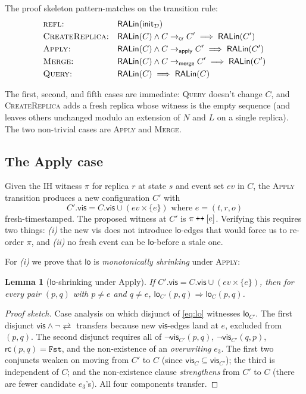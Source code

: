 \documentclass[11pt,a4paper]{article}
\newtheorem{lemma}[theorem]{Lemma}
\theoremstyle{definition}
\theoremstyle{remark}
\newcommand{\RDT}{\ensuremath{\mathcal{D}}}
\newcommand{\mrc}{\mathsf{rc}}
\newcommand{\mvis}{\mathsf{vis}}
\newcommand{\mlo}{\mathsf{lo}}
\newcommand{\Fst}{\mathtt{Fst}}
\newcommand{\ev}{\mathit{ev}}
\newcommand{\commute}{\mathrel{\rightleftarrows}}
\newcommand{\RALin}{\mathsf{RALin}}
\begin{document}
The proof skeleton pattern-matches on the transition rule:
\begin{align*}
  &\textsc{refl:} & & \RALin(\mathsf{init}_\RDT) \\
  &\textsc{CreateReplica:} & & \RALin(C) \wedge C \to_{\mathsf{cr}} C' \;\Longrightarrow\; \RALin(C') \\
  &\textsc{Apply:} & & \RALin(C) \wedge C \to_{\mathsf{apply}} C' \;\Longrightarrow\; \RALin(C') \\
  &\textsc{Merge:} & & \RALin(C) \wedge C \to_{\mathsf{merge}} C' \;\Longrightarrow\; \RALin(C') \\
  &\textsc{Query:} & & \RALin(C) \;\Longrightarrow\; \RALin(C)
\end{align*}

The first, second, and fifth cases are immediate: \textsc{Query}
doesn't change $C$, and \textsc{CreateReplica} adds a fresh replica
whose witness is the empty sequence (and leaves others unchanged
modulo an extension of $N$ and $L$ on a single replica). The two
non-trivial cases are \textsc{Apply} and \textsc{Merge}.

\subsection{The Apply case}
\label{sec:bridge-apply}

Given the IH witness $\pi$ for replica $r$ at state $s$ and event
set $\ev$ in $C$, the \textsc{Apply} transition produces a new
configuration $C'$ with
\[
  C'.\mvis = C.\mvis \cup (\ev \times \{e\}) \text{ where } e = (t, r, o)
\]
fresh-timestamped. The proposed witness at $C'$ is $\pi \mathbin{\text{\tt ++}} [e]$.
Verifying this requires two things: \emph{(i)} the new vis does not
introduce $\mlo$-edges that would force us to re-order $\pi$, and
\emph{(ii)} no fresh event can be $\mlo$-before a stale one.

For \emph{(i)} we prove that $\mlo$ is \emph{monotonically shrinking}
under \textsc{Apply}:

\begin{lemma}[$\mlo$-shrinking under Apply]
\label{lem:lo-shrink}
If $C'.\mvis = C.\mvis \cup (\ev \times \{e\})$, then for every pair
$(p, q)$ with $p \neq e$ and $q \neq e$, $\mlo_{C'}(p, q) \Longrightarrow
\mlo_C(p, q)$.
\end{lemma}

\begin{proof}[Proof sketch]
  Case analysis on which disjunct of \eqref{eq:lo} witnesses
  $\mlo_{C'}$. The first disjunct $\mvis \wedge \neg\commute$
  transfers because new $\mvis$-edges land at $e$, excluded from
  $(p,q)$. The second disjunct requires all of $\neg\mvis_{C'}(p,q)$,
  $\neg\mvis_{C'}(q,p)$, $\mrc(p,q) = \Fst$, and the non-existence of
  an \emph{overwriting} $e_3$. The first two conjuncts weaken on
  moving from $C'$ to $C$ (since $\mvis_C \subseteq \mvis_{C'}$); the
  third is independent of $C$; and the non-existence clause
  \emph{strengthens} from $C'$ to $C$ (there are fewer candidate
  $e_3$'s). All four components transfer.
\end{proof}
\end{document}
